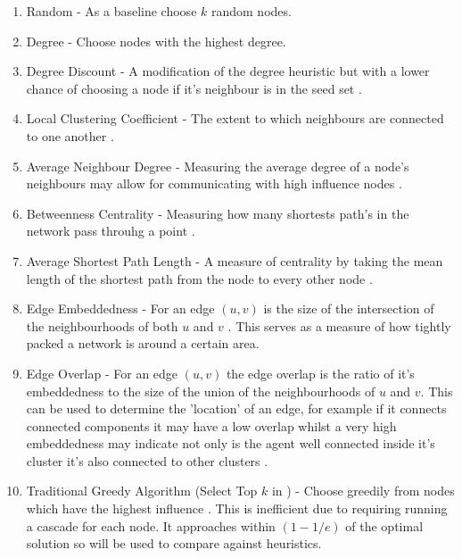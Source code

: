 \documentclass{article}
\begin{document}
\begin{enumerate}
	\item Random - As a baseline choose $k$ random nodes.
	\item Degree - Choose nodes with the highest degree.
	\item Degree Discount - A modification of the degree heuristic but with a lower chance of choosing a node if it's neighbour is in the seed set \cite{chen2009efficient}.
	\item Local Clustering Coefficient - The extent to which neighbours are connected to one another \cite{franks2014learning}.
	\item Average Neighbour Degree - Measuring the average degree of a node's neighbours may allow for communicating with high influence nodes \cite{franks2014learning}.
	\item Betweenness Centrality - Measuring how many shortests path's in the network pass throuhg a point \cite{franks2014learning}.
	\item Average Shortest Path Length - A measure of centrality by taking the mean length of the shortest path from the node to every other node \cite{franks2014learning}.
	\item Edge Embeddedness - For an edge $(u,v)$ is the size of the intersection of the neighbourhoods of both $u$ and $v$ \cite{franks2014learning}. This serves as a measure of how tightly packed a network is around a certain area.
	\item Edge Overlap - For an edge $(u,v)$ the edge overlap is the ratio of it's embeddedness to the size of the union of the neighbourhoods of $u$ and $v$. This can be used to determine the 'location' of an edge, for example if it connects connected components it may have a low overlap whilst a very high embeddedness may indicate not only is the agent well connected inside it's cluster it's also connected to other clusters \cite{franks2014learning}.
	\item Traditional Greedy Algorithm (Select Top $k$ in \cite{yang2019influence}) - Choose greedily from nodes which have the highest influence \cite{kempe2005influential}. This is inefficient due to requiring running a cascade for each node. It approaches within $(1-1/e)$ of the optimal solution so will be used to compare against heuristics.
\end{enumerate}
\end{document}
